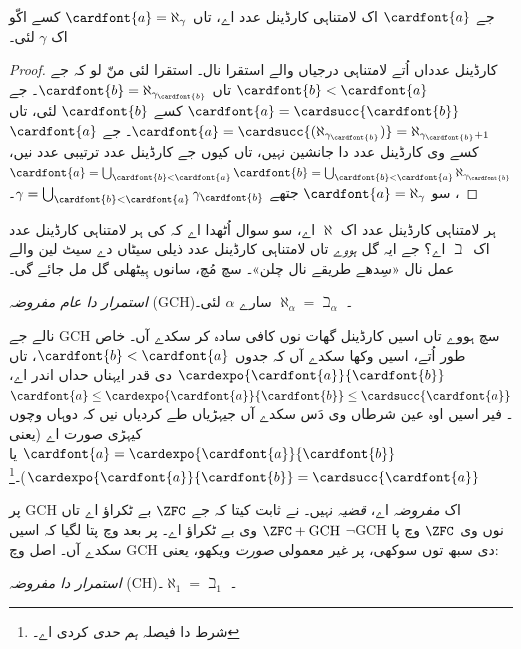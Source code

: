 \documentclass[../../../include/open-logic-section]{subfiles}
\begin{document}
\begin{prop}
جے $\cardfont{a}$ اک لامتناہی کارڈینل عدد اے، تاں $\cardfont{a} =
\aleph_\gamma$ کسے اکّو اک $\gamma$ لئی۔
\end{prop}

\begin{proof}
کارڈینل عدداں اُتے لامتناہی درجیاں والے استقرا نال۔ استقرا لئی منّ لو کہ جے $\cardfont{b} < \cardfont{a}$ تاں $\cardfont{b} =
\aleph_{\gamma_\cardfont{b}}$۔ جے $\cardfont{a} =
\cardsucc{\cardfont{b}}$ کسے $\cardfont{b}$ لئی، تاں $\cardfont{a} =
\cardsucc{(\aleph_{\gamma_\cardfont{b}})}=
\aleph_{\gamma_\cardfont{b}+1}$۔ جے $\cardfont{a}$ کسے وی کارڈینل عدد دا جانشین نہیں، تاں کیوں جے کارڈینل عدد ترتیبی عدد نیں،
$\cardfont{a} = \bigcup_{\cardfont{b} < \cardfont{a}} \cardfont{b} =
\bigcup_{\cardfont{b} < \cardfont{a}}{\aleph_{\gamma_\cardfont{b}}}$،
سو $\cardfont{a} = \aleph_\gamma$ جتھے $\gamma =
\bigcup_{\cardfont{b} < \cardfont{a}}\gamma_\cardfont{b}$۔
\end{proof}

ہر لامتناہی کارڈینل عدد اک $\aleph$ اے، سو سوال اُٹھدا اے کہ کی ہر لامتناہی کارڈینل عدد اک~$\beth$ اے؟ جے ایہ گل \emph{ہووے} تاں لامتناہی کارڈینل عدد ذیلی سیٹاں دے سیٹ لین والے عمل نال «سِدھے طریقے نال چلن»۔ سچ مُچ، سانوں ہِیٹھلی گل مل جائے گی۔

\begin{defish}
\emph{استمرار دا عام مفروضہ} (GCH)۔ $\aleph_\alpha  = \beth_\alpha$ سارے $\alpha$ لئی۔
\end{defish}

نالے جے GCH سچ ہووے تاں اسیں کارڈینل گھات نوں کافی سادہ کر سکدے آں۔ خاص طور اُتے، اسیں وکھا سکدے آں کہ جدوں $\cardfont{b} < \cardfont{a}$، تاں $\cardexpo{\cardfont{a}}{\cardfont{b}}$ دی قدر ایہناں حداں اندر اے، $\cardfont{a}\leq \cardexpo{\cardfont{a}}{\cardfont{b}} \leq
\cardsucc{\cardfont{a}}$۔ فیر اسیں اوہ عین شرطاں وی دَس سکدے آں جیہڑیاں طے کردیاں نیں کہ دوہاں وچوں کیہڑی صورت اے (یعنی $\cardfont{a} = \cardexpo{\cardfont{a}}{\cardfont{b}}$ یا $\cardexpo{\cardfont{a}}{\cardfont{b}} =
\cardsucc{\cardfont{a}}$)۔\footnote{شرط دا فیصلہ \emph{ہم حدی} کردی اے۔}

پر GCH اک \emph{مفروضہ} اے، \emph{قضیہ} نہیں۔ \citet{Godel1938} نے ثابت کیتا کہ جے $\ZFC$ بے ٹکراؤ اے تاں $\ZFC + \text{GCH}$ وی بے ٹکراؤ اے۔ پر بعد وچ پتا لگیا کہ اسیں $\lnot$GCH نوں وی $\ZFC$ وچ پا سکدے آں۔ اصل وچ GCH دی سبھ توں سوکھی، پر غیر معمولی \emph{صورت} ویکھو، یعنی:

\begin{defish}
\emph{استمرار دا مفروضہ} (CH)۔ $\aleph_1 = \beth_1$۔
\end{defish}
\end{document}
